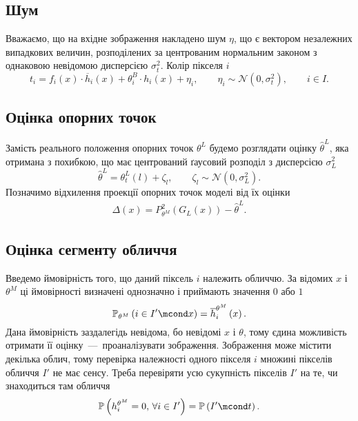 \subsection{Шум}

Вважаємо,
що на вхідне зображення накладено шум $\eta$,
що є вектором незалежних випадкових величин,
розподілених за центрованим нормальним законом
з однаковою невідомою дисперсією $\sigma_t^2$.
Колір пікселя $i$
\begin{equation*}
  t_i = f_i\left( x \right) \cdot \overline{h}_i\left( x \right)
    + \theta_i^B \cdot h_i\left( x \right) + \eta_i,\qquad
  \eta_i \sim \mathcal{N}\left( 0, \sigma^2_t\right), \qquad
  i \in I.
\end{equation*}

\subsection{Оцінка опорних точок}

Замість реального положення опорних точок $\theta^L$
будемо розглядати оцінку $\hat{\theta}^L$,
яка отримана з похибкою,
що має центрований ґаусовий розподіл
з дисперсією $\sigma^2_L$
\begin{equation*}
  \hat{\theta}^L = \theta_t^L\left( l \right) + \zeta_l,
  \qquad \zeta_l \sim \mathcal{N}\left( 0, \sigma_L^2 \right).
\end{equation*}
Позначимо відхилення проекції опорних точок моделі
від їх оцінки
\begin{align*}
  \Delta\left( x \right)
  = P^2_{\theta^M}\left( G_L\left( x \right) \right) - \hat{\theta}^L.
\end{align*}

\subsection{Оцінка сегменту обличчя}

Введемо ймовірність того, що даний піксель $i$ належить обличчю.
За відомих $x$ і $\theta^M$ ці ймовірності визначені однозначно
і приймають значення $0$ або $1$
\begin{equation*}
  \mathbb{P}_{\theta^M}\left( i \in I' \mcond x \right)
  = \overline{h}_i^{\theta^M}\left( x \right).
\end{equation*}
Дана ймовірність заздалегідь невідома, бо невідомі $x$ і $\theta$,
тому єдина можливість отримати її оцінку~---~проаналізувати зображення.
Зображення може містити декілька облич,
тому перевірка належності одного пікселя $i$ множині пікселів обличчя $I'$
не має сенсу.
Треба перевіряти усю сукупність пікселів $I'$ на те,
чи знаходиться там обличчя
\begin{equation*}
  \mathbb{P}\left( h_i^{\theta^M} = 0, \, \forall i \in I' \right)
  = \mathbb{P}\left( I' \mcond t \right).
\end{equation*}

